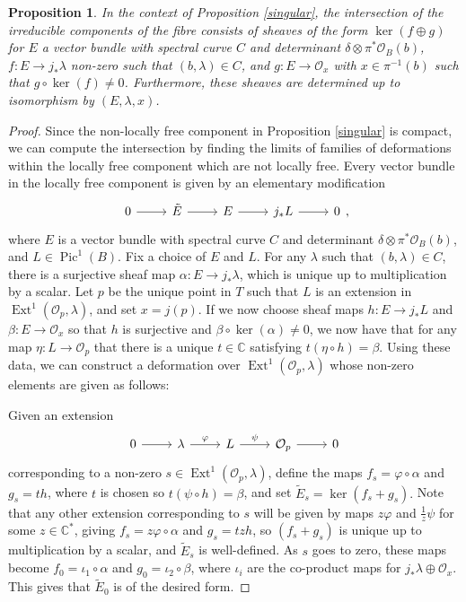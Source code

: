 \documentclass{article}[12pt]
\newtheorem{proposition}[theorem]{Proposition}
\theoremstyle{definition}
\theoremstyle{remark}
\newcommand \C{\mathbb C}
\newcommand \vp{\varphi}
\numberwithin{equation}{section}
\newcommand \mc{\mathcal}
\DeclareMathOperator{\Pic}{Pic}
\DeclareMathOperator{\Ext}{Ext}
\begin{document}
\begin{proposition}
	In the context of Proposition \ref{singular}, the intersection of the irreducible components of the fibre consists of sheaves of the form $\ker(f\oplus g)$ for $E$ a vector bundle with spectral curve $C$ and determinant $\delta\otimes \pi^*\mc{O}_B(b)$, $f:E\to j_*\lambda$ non-zero such that $(b,\lambda) \in C$,
	and $g: E\to \mc{O}_x$ with $x \in \pi^{-1}(b)$ such that $g\circ \ker(f)\neq 0$. Furthermore, these sheaves are determined up to isomorphism by $(E,\lambda,x)$.
\end{proposition}
\begin{proof}
	Since the non-locally free component in Proposition \ref{singular} is compact, we can compute the intersection by finding the limits of families of deformations within the locally free component which are not locally free. Every vector bundle in the locally free component is given by an elementary modification $$\begin{tikzcd}
		0 \arrow[r] & \tilde{E} \arrow[r] & E \arrow[r] & j_*L \arrow[r]  & 0
	\end{tikzcd},$$
	where $E$ is a vector bundle with spectral curve $C$ and determinant $\delta\otimes \pi^*\mc{O}_B(b)$, and $L \in \Pic^1(B)$. Fix a choice of $E$ and $L$. For any $\lambda$ such that $(b,\lambda) \in C$, there is a surjective sheaf map $\alpha:E\to j_*\lambda$, which is unique up to multiplication by a scalar. Let $p$ be the unique point in $T$ such that $L$ is an extension in $\Ext^1(\mc{O}_p, \lambda)$, and set $x=j(p)$. If we now choose sheaf maps $h:E\to j_*L$ and $\beta:E\to \mc{O}_{x}$ so that $h$ is surjective and $\beta\circ \ker(\alpha)\neq 0$, we now have that for any map $\eta:L\to \mc{O}_p$ that there is a unique $t \in \C$ satisfying $t(\eta\circ h)=\beta$. Using these data, we can construct a deformation over $\Ext^1(\mc{O}_p, \lambda)$ whose non-zero elements are given as follows:
	
	Given an extension $$\begin{tikzcd}0 \arrow[r] & \lambda \arrow[r, "\vp"] & L \arrow[r, "\psi"] & \mc{O}_p \arrow[r] &0\end{tikzcd}$$ corresponding to a non-zero $s  \in \Ext^1(\mc{O}_p, \lambda)$, define the maps $f_s=\vp\circ \alpha$ and $g_s=th$, where $t$ is chosen so $t(\psi\circ h)=\beta$, and set $\tilde{E}_s=\ker(f_s+g_s).$ Note that any other extension corresponding to $s$ will be given by maps $z\vp$ and $\frac{1}{z}\psi$ for some $z \in \C^*$, giving $f_s=z\vp\circ \alpha$ and $g_s=tzh$, so $(f_s+g_s)$ is unique up to multiplication by a scalar, and $\tilde{E}_s$ is well-defined. As $s$ goes to zero, these maps become $f_0=\iota_1\circ \alpha$ and $g_0=\iota_2\circ \beta$, where $\iota_i$ are the co-product maps for $j_*\lambda\oplus \mc{O}_{x}$. This gives that $\tilde{E}_0$ is of the desired form. 
	

\end{proof}
\end{document}
